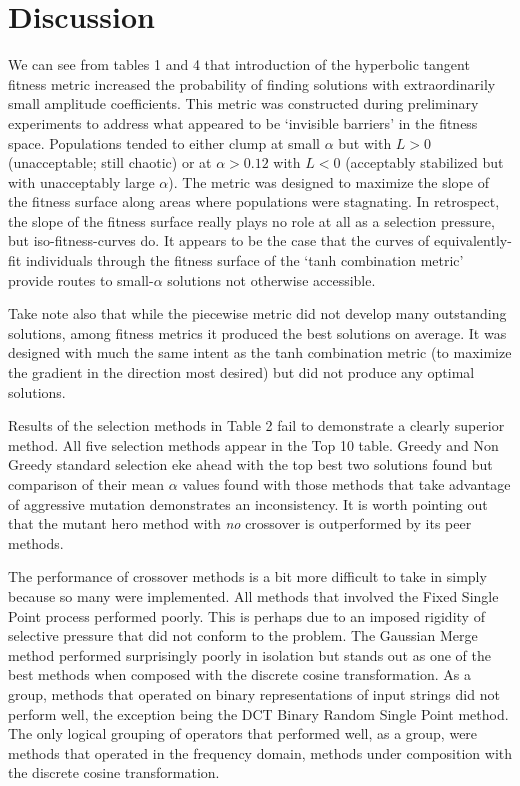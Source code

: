 \documentclass[12pt]{article}
\begin{document}
\clearpage

\section{Discussion}
We can see from tables 1 and 4 that introduction of the hyperbolic tangent
fitness metric increased the probability of finding solutions with
extraordinarily small amplitude coefficients.  This metric was constructed
during preliminary experiments to address what appeared to be `invisible
barriers' in the fitness space.  Populations tended to either clump at
small $\alpha$ but with $L > 0$ (unacceptable; still chaotic) or at
$\alpha > 0.12$ with $L < 0$ (acceptably stabilized but with unacceptably large
$\alpha$).  The metric was designed to maximize the slope of the fitness
surface along areas where populations were stagnating.  In retrospect, the
slope of the fitness surface really plays no role at all as a selection
pressure, but iso-fitness-curves do.  It appears to be the case that the
curves of equivalently-fit individuals through the fitness surface of the
`tanh combination metric' provide routes to small-$\alpha$ solutions not
otherwise accessible.

Take note also that while the piecewise metric did not develop many outstanding solutions, among fitness metrics it produced the best solutions on average.  It was
designed with much the same intent as the tanh combination metric (to maximize
the gradient in the direction most desired) but did not produce any optimal
solutions.

Results of the selection methods in Table 2 fail to demonstrate a clearly
superior method.  All five selection methods appear in the Top 10 table.
Greedy and Non Greedy standard selection eke ahead with the top best two
solutions found but comparison of their mean $\alpha$ values found with those
methods that take advantage of aggressive mutation demonstrates an inconsistency.  It is worth pointing out that the mutant hero method with \textit{no} crossover is outperformed by its peer methods.

The performance of crossover methods is a bit more difficult to take in simply
because so many were implemented.  All methods that involved the Fixed Single Point process performed poorly.  This is perhaps due to an imposed rigidity of
selective pressure that did not conform to the problem.  The Gaussian Merge method performed surprisingly poorly in isolation but stands out as one of the best methods when composed with the discrete cosine transformation.  As a group, methods that operated on binary representations of input strings did not perform well, the exception being the DCT Binary Random Single Point method.  The only logical grouping of operators that performed well, as a group, were methods that operated in the frequency domain, methods under composition with the discrete cosine transformation.
\end{document}
